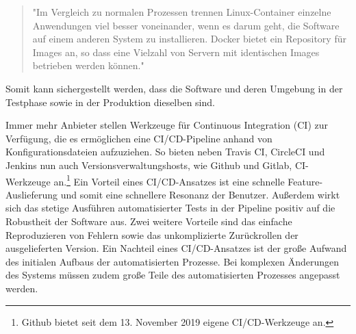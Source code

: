 \begin{quote}
"Im Vergleich zu normalen Prozessen trennen Linux-Container
einzelne Anwendungen viel besser voneinander, wenn es darum geht, die Software auf einem anderen
System zu installieren. Docker bietet ein Repository für Images an, so dass eine Vielzahl
von Servern mit identischen Images betrieben werden können."\cite[S. 56]{ContinuousDeliveryWolff}
\end{quote}

Somit kann sichergestellt werden, dass die Software und deren Umgebung in der Testphase
sowie in der Produktion dieselben sind.

Immer mehr Anbieter stellen Werkzeuge für Continuous Integration (CI) zur Verfügung,
die es ermöglichen eine CI/CD-Pipeline anhand von Konfigurationsdateien aufzuziehen. So bieten
neben Travis CI, CircleCI und Jenkins nun auch Versionsverwaltungshosts, wie Github und
Gitlab, CI-Werkzeuge an.\footnote{Github bietet seit dem 13. November 2019 eigene CI/CD-Werkzeuge an.\cite{GithubCIToolsHeise}}
Ein Vorteil eines CI/CD-Ansatzes ist eine schnelle Feature-Auslieferung und somit eine schnellere Resonanz der Benutzer.
Außerdem wirkt sich das stetige Ausführen automatisierter Tests in der Pipeline positiv auf die Robustheit der Software aus.
Zwei weitere Vorteile sind das einfache Reproduzieren von Fehlern sowie das unkomplizierte Zurückrollen der ausgelieferten Version.
Ein Nachteil eines CI/CD-Ansatzes ist der große Aufwand des initialen Aufbaus der automatisierten Prozesse.
Bei komplexen Änderungen des Systems müssen zudem große Teile des automatisierten Prozesses angepasst werden.
